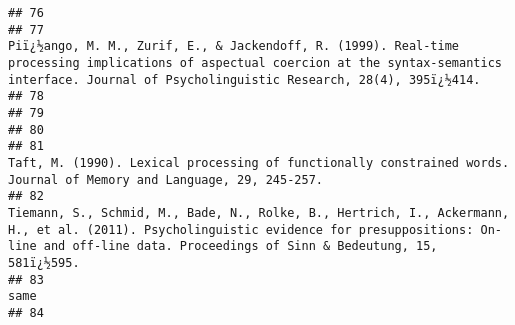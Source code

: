 \documentclass[
  english,
  man]{apa6}
\begin{document}
\begin{verbatim}
## 76                                                                                                                                                                                                                                                                                                                     
## 77                                                                                                             Piï¿½ango, M. M., Zurif, E., & Jackendoff, R. (1999). Real-time processing implications of aspectual coercion at the syntax-semantics interface. Journal of Psycholinguistic Research, 28(4), 395ï¿½414.
## 78                                                                                                                                                                                                                                                                                                                     
## 79                                                                                                                                                                                                                                                                                                                     
## 80                                                                                                                                                                                                                                                                                                                     
## 81                                                                                                                                                                                                  Taft, M. (1990). Lexical processing of functionally constrained words. Journal of Memory and Language, 29, 245-257.
## 82                                                                                                  Tiemann, S., Schmid, M., Bade, N., Rolke, B., Hertrich, I., Ackermann, H., et al. (2011). Psycholinguistic evidence for presuppositions: On-line and off-line data. Proceedings of Sinn & Bedeutung, 15, 581ï¿½595.
## 83                                                                                                                                                                                                                                                                                                                 same
## 84                                                                                                                                                                                                                                                                                                                     

\end{verbatim}
\end{document}
